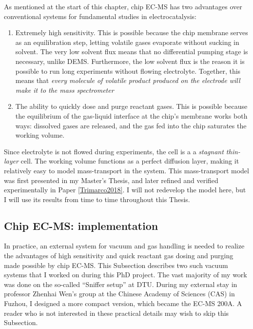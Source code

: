 As mentioned at the start of this chapter, chip EC-MS has two advantages over conventional systems for fundamental studies in electrocatalysis:

\begin{enumerate}
\item Extremely high sensitivity. This is possible because the chip membrane serves as an equilibration step, letting volatile gases evaporate without sucking in solvent. The very low solvent flux means that no differential pumping stage is necessary, unlike DEMS. Furthermore, the low solvent flux is the reason it is possible to run long experiments without flowing electrolyte. Together, this means that \textit{every molecule of volatile product produced on the electrode will make it to the mass spectrometer} 

\item The ability to quickly dose and purge reactant gases. This is possible because the equilibrium of the gas-liquid interface at the chip's membrane works both ways: dissolved gases are released, and the gas fed into the chip saturates the working volume.
\end{enumerate}

Since electrolyte is not flowed during experiments, the cell is a a \textit{stagnant thin-layer} cell. The working volume functions as a perfect diffusion layer, making it relatively easy to model mass-transport in the system. This mass-transport model was first presented in my Master's Thesis\cite{Scott2016_MSc}, and later refined and verified experimentally in Paper \ref{Trimarco2018}. I will not redevelop the model here, but I will use its results from time to time throughout this Thesis.

\subsection{Chip EC-MS: implementation}\label{subsec:setups}

In practice, an external system for vacuum and gas handling is needed to realize the advantages of high sensitivity and quick reactant gas dosing and purging made possible by chip EC-MS. This Subsection describes two such vacuum systems that I worked on during this PhD project. The vast majority of my work was done on the so-called ``Sniffer setup'' at DTU. During my external stay in professor Zhenhai Wen's group at the Chinese Academy of Sciences (CAS) in Fuzhou, I designed a more compact version, which became the EC-MS 200A. A reader who is not interested in these practical details may wish to skip this Subsection. 

